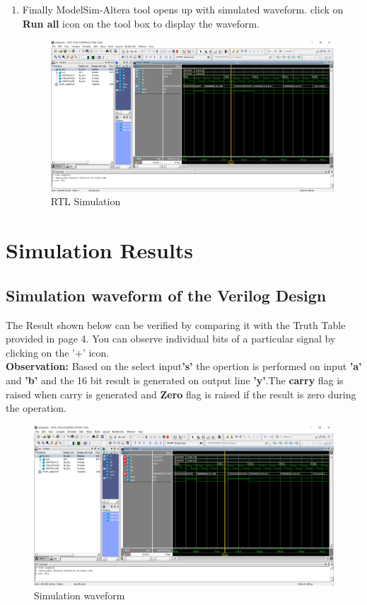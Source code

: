 \documentclass[12pt,singleside,a4paper]{article}
\begin{document}
\begin{enumerate}
        \item Finally ModelSim-Altera tool opens up with simulated waveform. click on \textbf{Run all} icon on the tool box to display the waveform.
            \begin{figure}[H]
                \centering
                \includegraphics[width=14cm,keepaspectratio]{waveform1.png}
            \caption{RTL Simulation}
            \end{figure}
        
    \end{enumerate}
\newpage
\section{Simulation Results}

\subsection*{Simulation waveform of the Verilog Design}
The Result shown below can be verified by comparing it with the Truth Table \\provided in page 4.\newline
You can observe individual bits of a particular signal by clicking on the '+' icon.\\
\textbf{Observation:} Based on the select input\textbf{'s'} the opertion is performed on input \textbf{'a'} and \textbf{'b'} and the 16 bit result is generated on output line \textbf{'y'}.The \textbf{carry} flag is raised when carry is generated and \textbf{Zero} flag is raised if the result is zero during the operation.

\begin{figure}[H]
    \centering
    \includegraphics[width = 14cm,keepaspectratio]{waveform1n.png}
\caption{Simulation waveform}
\end{figure}
\end{document}
